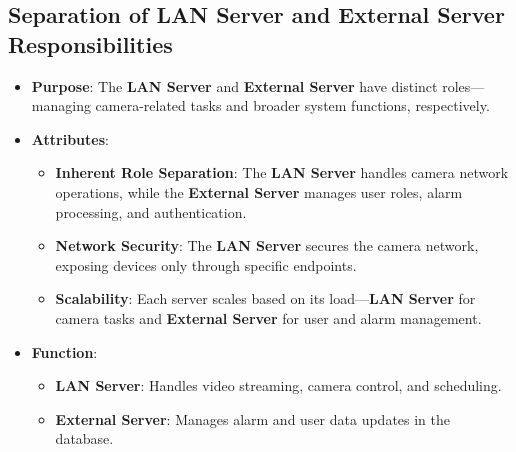 \documentclass{article}
\begin{document}
\subsection{Separation of LAN Server and External Server Responsibilities}
\begin{itemize}
    \item \textbf{Purpose}: The \textbf{LAN Server} and \textbf{External Server} have distinct roles—managing camera-related tasks and broader system functions, respectively.
    \item \textbf{Attributes}:
    \begin{itemize}
        \item \textbf{Inherent Role Separation}: The \textbf{LAN Server} handles camera network operations, while the \textbf{External Server} manages user roles, alarm processing, and authentication.
        \item \textbf{Network Security}: The \textbf{LAN Server} secures the camera network, exposing devices only through specific endpoints.
        \item \textbf{Scalability}: Each server scales based on its load—\textbf{LAN Server} for camera tasks and \textbf{External Server} for user and alarm management.
    \end{itemize}
    \item \textbf{Function}:
    \begin{itemize}
        \item \textbf{LAN Server}: Handles video streaming, camera control, and scheduling.
        \item \textbf{External Server}: Manages alarm and user data updates in the database.
    \end{itemize}
\end{itemize}
\end{document}
